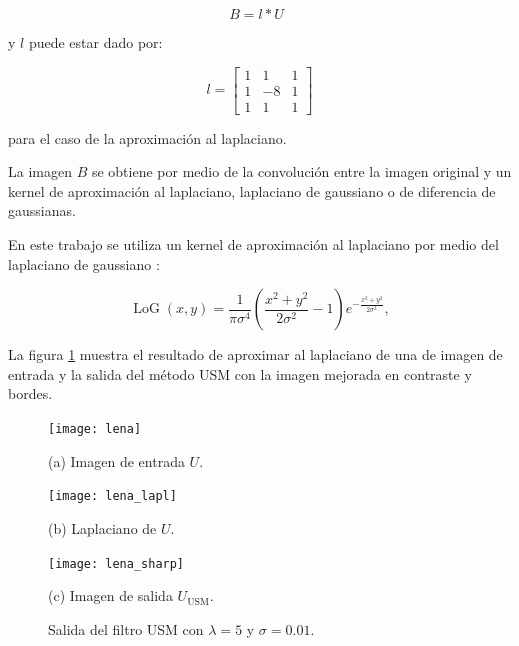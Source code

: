 \begin{equation}
\label{eq:unsharfilter}
B=l*U \enspace 
\end{equation}

y $l$ puede estar dado por:

\begin{equation} l = \left[
\begin{array}{ccc}
1 & 1 & 1\\
1 & -8 & 1\\
1 & 1 & 1
\end{array}\right]
\end{equation}

para el caso de la aproximaci\'on al laplaciano.

La imagen $B$ se obtiene por medio de la convoluci\'on entre la imagen original y un kernel de aproximaci\'on al laplaciano, laplaciano de gaussiano o de diferencia de gaussianas.


En este trabajo se utiliza un kernel de aproximaci\'on al laplaciano por medio del laplaciano de gaussiano \cite{sotak1989laplacian}:

\begin{equation}
\label{eq:log}
\operatorname{LoG}(x,y) = \frac{1}{\pi\sigma^4}\left(\frac{x^2+y^2}{2\sigma^2} - 1\right)e^{-\frac{x^2+y^2}{2\sigma^2}},
\end{equation}

La figura \ref{fig:exampleUSM} muestra el resultado de aproximar al laplaciano de una de imagen de entrada y la salida del m\'etodo USM con la imagen mejorada en contraste y bordes. 

\begin{figure}[H]
%
\begin{minipage}{0.25\textwidth}
  \centering
  \centerline{\texttt{[image: lena]}}
  \centerline{(a) Imagen de entrada $U$.}\medskip
\end{minipage}
\hfill
\begin{minipage}{0.25\textwidth}
  \centering
  \centerline{\texttt{[image: lena\_lapl]}}
  \centerline{(b) Laplaciano de $U$.}
\end{minipage}
\hfill
\begin{minipage}{0.25\textwidth}
  \centering
  \centerline{\texttt{[image: lena\_sharp]}}
  \centerline{(c) Imagen de salida $U_{\textrm{USM}}$.}\medskip
\end{minipage}
%
\caption[Ejemplo de mejora en imagen con ]{Salida del filtro USM con $\lambda = 5$ y $\sigma = 0.01$. \label{fig:exampleUSM}}
%
\end{figure}


